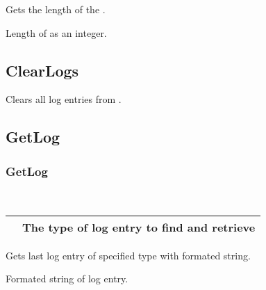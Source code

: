\documentclass[letterpaper,10pt,english]{sphinxmanual}
\begin{document}
\begin{fulllineitems}
\label{\detokenize{log:_CPPv2N6pessum10GetLogSizeEv}}%
\pysigstartmultiline
{}%
\pysigstopmultiline
Gets the length of the {\hyperref[\detokenize{log:_CPPv2N6pessum11global_logsE}]{}}.

 Length of {\hyperref[\detokenize{log:_CPPv2N6pessum11global_logsE}]{}} as an integer.

\end{fulllineitems}



\subsection{ClearLogs}
\label{\detokenize{log:clearlogs}}

\begin{fulllineitems}
\label{\detokenize{log:_CPPv2N6pessum9ClearLogsEv}}%
\pysigstartmultiline
{}%
\pysigstopmultiline
Clears all log entries from {\hyperref[\detokenize{log:_CPPv2N6pessum11global_logsE}]{}}.

\end{fulllineitems}



\subsection{GetLog}
\label{\detokenize{log:getlog}}

\subsubsection{GetLog}
\label{\detokenize{log:id1}}

\begin{fulllineitems}
\label{\detokenize{log:_CPPv2N6pessum6GetLogEi}}%
\pysigstartmultiline
{}%
\pysigstopmultiline~

\begin{savenotes}\sphinxattablestart
\centering
\begin{tabulary}{\linewidth}[t]{|T|T|}
\hline

&
The type of log entry to find and retrieve
\\
\hline
\end{tabulary}
\par
\sphinxattableend\end{savenotes}

Gets last log entry of specified type with formated string.

 Formated string of log entry.

\end{fulllineitems}
\end{document}
